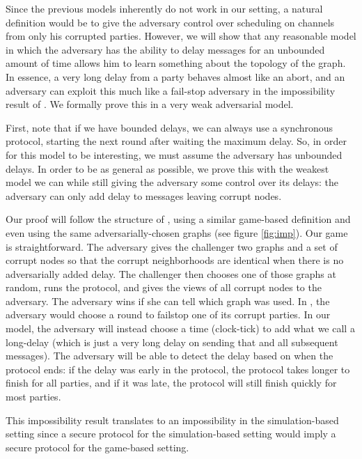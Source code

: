 
Since the previous models inherently do not work in our setting, a natural definition would be to give the adversary control over 
scheduling on channels from only his corrupted parties. However, we will show that any reasonable 
model in which the adversary has the ability to delay messages for an 
unbounded 
amount of time allows him to learn something about the topology of the graph.
In essence, a very long delay from a party behaves almost like an abort, and 
an 
adversary can exploit this much like a fail-stop adversary in the 
impossibility 
result of \cite{MOR15}. We formally prove this in a very weak 
adversarial model.

First, note that if we have bounded delays, we can always use a synchronous protocol, starting the next round after waiting the maximum delay. So, in order for this model to be interesting, we must assume the adversary has unbounded delays.
In order to be as general as possible, we prove this with the weakest model we can while still giving the adversary some control over its delays: the adversary can only add delay to messages leaving corrupt nodes.

Our proof will follow the structure of \cite{MOR15}, using a similar game-based definition and even using the same adversarially-chosen graphs (see figure \ref{fig:imp}). Our game is straightforward. The adversary gives the challenger two graphs and a set of corrupt nodes so that the corrupt neighborhoods are identical when there is no adversarially added delay. The challenger then chooses one of those graphs at random, runs the protocol, and gives the views of all corrupt nodes to the adversary. The adversary wins if she can tell which graph was used. In \cite{MOR15}, the adversary would choose a round to failstop one of its corrupt parties. In our model, the adversary will instead choose a time (clock-tick) to add what we call a long-delay (which is just a very long delay on sending that and all subsequent messages). The adversary will be able to detect the delay based on when the protocol ends: if the delay was early in the protocol, the protocol takes longer to finish for all parties, and if it was late, the protocol will still finish quickly for most parties.

This impossibility result translates to an impossibility in the simulation-based setting since a secure protocol for the simulation-based setting would imply a secure protocol for the game-based setting.

